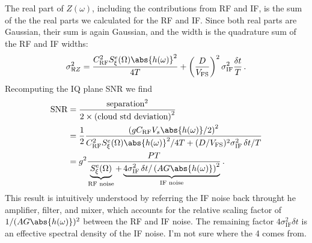 
The real part of $Z(\omega)$, including the contributions from RF and IF, is the sum of the the real parts we calculated for the RF and IF.
Since both real parts are Gaussian, their sum is again Gaussian, and the width is the quadrature sum of the RF and IF widths:
\begin{equation}
  \sigma_{\Re Z}^2 =
    \frac{C_\text{RF}^2 S^e_\xi(\Omega) \abs{h(\omega)}^2}{4T}
    + \left( \frac{D}{V_\text{FS}} \right)^2 \sigma_\text{IF}^2 \frac{\delta t}{T} \, .
\end{equation}
Recomputing the IQ plane SNR we find
\begin{align}
  \text{SNR}
    &= \frac{\text{separation}^2}{2 \times \left( \text{cloud std deviation} \right)^2} \nonumber \\
    &= \frac{1}{2}
       \frac{\left( g C_\text{RF} V_s \abs{h(\omega)} / 2 \right)^2}
            {C_\text{RF}^2 S^e_\xi(\Omega) \abs{h(\omega)}^2 / 4T + (D/V_\text{FS})^2 \sigma_\text{IF}^2 \, \delta t / T} \nonumber \\
    &= g^2 \frac{P T}
        {\underbrace{S^e_\xi (\Omega)}_\text{RF noise} + \underbrace{4 \sigma_\text{IF}^2 \, \delta t / \left( A G \abs{h(\omega)} \right)^2}_\text{IF noise}}
  \, .
\end{align}
This result is intuitively understood by referring the IF noise back throught he amplifier, filter, and mixer, which accounts for the relative scaling factor of $1/(AG\abs{h(\omega)})^2$ between the RF and IF noise.
The remaining factor $4 \sigma_\text{IF}^2 \delta t$ is an effective spectral density of the IF noise.
I'm not sure where the 4 comes from.
